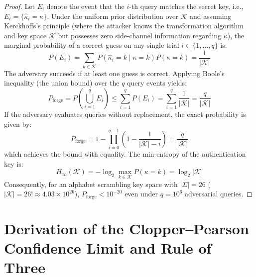 \begin{proof}
Let $E_i$ denote the event that the $i$-th query matches the secret key, i.e., $E_i = \{\hat{\kappa}_i = \kappa\}$. Under the uniform prior distribution over $\mathcal{K}$ and assuming Kerckhoffs's principle (where the attacker knows the transformation algorithm and key space $\mathcal{K}$ but possesses zero side-channel information regarding $\kappa$), the marginal probability of a correct guess on any single trial $i \in \{1, \dots, q\}$ is:
\begin{equation}
    P(E_i) = \sum_{k \in \mathcal{K}} P(\hat{\kappa}_i = k \mid \kappa = k) P(\kappa = k) = \frac{1}{|\mathcal{K}|}
\end{equation}
The adversary succeeds if at least one guess is correct. Applying Boole's inequality (the union bound) over the $q$ query events yields:
\begin{equation}
    P_{\mathrm{forge}} = P\left( \bigcup_{i=1}^q E_i \right) \le \sum_{i=1}^q P(E_i) = \sum_{i=1}^q \frac{1}{|\mathcal{K}|} = \frac{q}{|\mathcal{K}|}
\end{equation}
If the adversary evaluates queries without replacement, the exact probability is given by:
\begin{equation}
    P_{\mathrm{forge}} = 1 - \prod_{i=0}^{q-1} \left(1 - \frac{1}{|\mathcal{K}| - i}\right) = \frac{q}{|\mathcal{K}|}
\end{equation}
which achieves the bound with equality. The min-entropy of the authentication key is:
\begin{equation}
    H_\infty(\mathcal{K}) = -\log_2 \max_{k \in \mathcal{K}} P(\kappa = k) = \log_2 |\mathcal{K}|
\end{equation}
Consequently, for an alphabet scrambling key space with $|\Sigma| = 26$ ($|\mathcal{K}| = 26! \approx 4.03 \times 10^{26}$), $P_{\mathrm{forge}} < 10^{-20}$ even under $q = 10^6$ adversarial queries.
\end{proof}

\section{Derivation of the Clopper--Pearson Confidence Limit and Rule of Three}
\label{app:proof_clopper_pearson}

